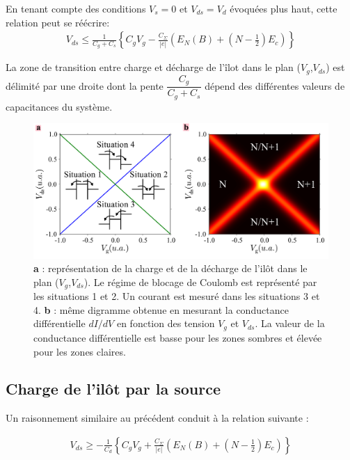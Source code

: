 En tenant compte des conditions $V_s= 0$ et $V_{ds} = V_d$ évoquées plus haut, cette relation peut se réécrire:
\begin{eqnarray}
V_{ds} \leq \frac{1}{C_g + C_s} \left\lbrace C_gV_g - \frac{C_{\Sigma}}{|e|}\left(E_N(B) + (N-\frac{1}{2})E_c \right) \right\rbrace 
\end{eqnarray}

La zone de transition entre charge et décharge de l'\^ilot dans le plan ($V_g$,$V_{ds}$) est délimité par une droite dont la pente $\dfrac{C_g}{C_g + C_s}$ dépend des différentes valeurs de capacitances du système.


\begin{figure}
\includegraphics[scale=0.5]{Theorie/Transport/figure3/figure3.pdf} 
\caption{\textbf{a} : représentation de la charge et de la décharge de l'il\^ot dans le plan ($V_g$,$V_{ds}$). Le régime de blocage de Coulomb est représenté par les situations 1 et 2. Un courant est mesuré dans les situations 3 et 4. \textbf{b} : m\^eme digramme obtenue en mesurant la conductance différentielle $dI/dV$ en fonction des tension $V_g$ et $V_{ds}$. La valeur de la conductance différentielle est basse pour les zones sombres et élevée pour les zones claires.}
\label{charge_discharge}
\end{figure}



\subsection{Charge de l'il\^ot par la source}
Un raisonnement similaire au précédent conduit à la relation suivante :

\begin{eqnarray}
V_{ds} \geq -\frac{1}{C_d} \left\lbrace C_gV_g + \frac{C_{\Sigma}}{|e|}\left( E_N(B) + (N-\frac{1}{2})E_c \right) \right\rbrace
\end{eqnarray}


